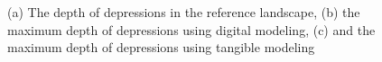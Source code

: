 \documentclass{isprs}
\begin{document}
\begin{figure}
\begin{center}
\caption{(a) The depth of depressions in the reference landscape, (b) the maximum depth of depressions using digital modeling, (c) and the maximum depth of depressions using tangible modeling}
\label{fig:max_depressions}
\end{center}
\end{figure}
%
%
\end{document}
